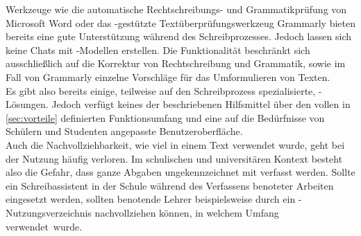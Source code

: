 \documentclass[../main.tex]{subfiles}
\begin{document}
Werkzeuge wie die automatische Rechtschreibungs- und Grammatikprüfung von Microsoft Word oder das -gestützte Textüberprüfungswerkzeug Grammarly bieten bereits eine gute 
Unterstützung während des Schreibprozesses. Jedoch lassen sich keine Chats mit -Modellen erstellen. Die Funktionalität beschränkt sich ausschließlich auf die Korrektur von 
Rechtschreibung und Grammatik, sowie im Fall von Grammarly einzelne Vorschläge für das Umformulieren von Texten.\cite{microsoftword,grammarly}\\
Es gibt also bereits einige, teilweise auf den Schreibprozess spezialisierte, -Lösungen. Jedoch verfügt keines der beschriebenen Hilfsmittel über den vollen in \autoref{sec:vorteile}
definierten Funktionsumfang und eine auf die Bedürfnisse von Schülern und Studenten angepasste Benutzeroberfläche.\\
Auch die Nachvollziehbarkeit, wie viel  in einem Text verwendet 
wurde, geht bei der Nutzung häufig verloren. Im schulischen und universitären Kontext besteht also die Gefahr, dass ganze Abgaben ungekennzeichnet mit  verfasst werden. Sollte ein 
Schreibassistent in der Schule während des Verfassens benoteter Arbeiten eingesetzt werden, sollten benotende Lehrer beispielsweise durch ein -Nutzungsverzeichnis 
nachvollziehen können, in welchem Umfang  \mbox{verwendet wurde.}
\end{document}
